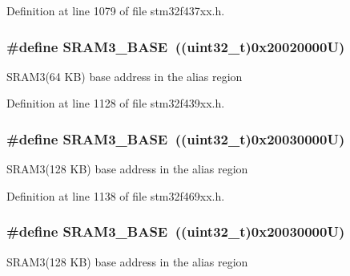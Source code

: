 Definition at line 1079 of file stm32f437xx.\+h.

\subsubsection[{\texorpdfstring{S\+R\+A\+M3\+\_\+\+B\+A\+SE}{SRAM3_BASE}}]{\setlength{\rightskip}{0pt plus 5cm}\#define S\+R\+A\+M3\+\_\+\+B\+A\+SE~((uint32\+\_\+t)0x20020000\+U)}\hypertarget{group___peripheral__memory__map_gadb41012a2428a526d7ee5ff0f61d2344}{}\label{group___peripheral__memory__map_gadb41012a2428a526d7ee5ff0f61d2344}
S\+R\+A\+M3(64 K\+B) base address in the alias region 

Definition at line 1128 of file stm32f439xx.\+h.

\subsubsection[{\texorpdfstring{S\+R\+A\+M3\+\_\+\+B\+A\+SE}{SRAM3_BASE}}]{\setlength{\rightskip}{0pt plus 5cm}\#define S\+R\+A\+M3\+\_\+\+B\+A\+SE~((uint32\+\_\+t)0x20030000\+U)}\hypertarget{group___peripheral__memory__map_gadb41012a2428a526d7ee5ff0f61d2344}{}\label{group___peripheral__memory__map_gadb41012a2428a526d7ee5ff0f61d2344}
S\+R\+A\+M3(128 K\+B) base address in the alias region 

Definition at line 1138 of file stm32f469xx.\+h.

\subsubsection[{\texorpdfstring{S\+R\+A\+M3\+\_\+\+B\+A\+SE}{SRAM3_BASE}}]{\setlength{\rightskip}{0pt plus 5cm}\#define S\+R\+A\+M3\+\_\+\+B\+A\+SE~((uint32\+\_\+t)0x20030000\+U)}\hypertarget{group___peripheral__memory__map_gadb41012a2428a526d7ee5ff0f61d2344}{}\label{group___peripheral__memory__map_gadb41012a2428a526d7ee5ff0f61d2344}
S\+R\+A\+M3(128 K\+B) base address in the alias region 

